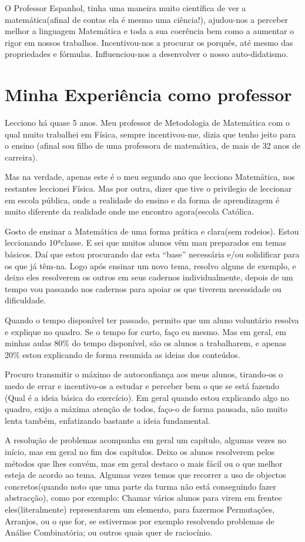O Professor Espanhol, tinha uma maneira muito científica de ver a matemática(afinal de contas ela é mesmo uma ciência!), ajudou-nos a perceber melhor a linguagem Matemática e toda a sua coerência bem como a aumentar o rigor em nossos trabalhos. Incentivou-nos a procurar os porquês, até mesmo das propriedades e fórmulas. Influenciou-nos a desenvolver o nosso auto-didatismo.


\section{Minha Experiência como professor}

Lecciono há quase 5 anos. Meu professor de Metodologia de Matemática com o qual muito trabalhei em Física, sempre  incentivou-me, dizia que tenho jeito para o ensino (afinal sou filho de uma professora de matemática, de mais de 32 anos de carreira).

Mas na verdade, apenas este é o meu segundo ano que lecciono Matemática, nos restantes leccionei Física. Mas por outra, dizer que tive o privilegio de leccionar em escola pública, onde a realidade do ensino e da forma de aprendizagem é muito diferente da realidade onde me encontro agora(escola Católica. 

Gosto de ensinar a Matemática de uma forma prática e clara(sem rodeios). Estou leccionando 10ªclasse. E sei que muitos alunos vêm mau preparados em temas básicos. Daí que estou procurando dar esta “base” necessária e/ou solidificar para os que já têm-na.
Logo após ensinar um novo tema, resolvo alguns de exemplo, e deixo eles resolverem os outros em seus cadernos individualmente, depois de um tempo vou passando nos cadernos para apoiar os que tiverem necessidade ou dificuldade.

Quando o tempo disponível ter passado, permito que um aluno voluntário resolva e explique no quadro. Se o tempo for curto, faço eu mesmo. Mas em geral, em minhas aulas 80\% do tempo disponível, são os alunos a trabalharem, e apenas 20\% estou explicando de forma resumida as ideias dos conteúdos. 

Procuro transmitir o máximo de autoconfiança aos meus alunos, tirando-os o medo de errar e incentivo-os a estudar e perceber bem o que se está fazendo (Qual é a ideia básica do exercício). Em geral quando estou explicando algo no quadro, exijo a máxima atenção de todos, faço-o de forma pausada, não muito lenta também, enfatizando bastante a ideia fundamental.

A resolução de problemas acompanha em geral um capítulo, algumas vezes no início, mas em geral no fim dos capítulos. Deixo os alunos resolverem pelos métodos que lhes convém, mas em geral destaco o mais fácil ou o que melhor esteja de acordo ao tema. Algumas vezes temos que recorrer a uso de objectos concretos(quando noto que uma parte da turma não está conseguindo fazer abstracção), como por exemplo: Chamar vários alunos para virem em frentee  eles(literalmente) representarem um elemento, para fazermos  Permutações, Arranjos, ou o que for, se estivermos por exemplo resolvendo problemas de Análise Combinatória; ou outros quais quer de raciocínio.

